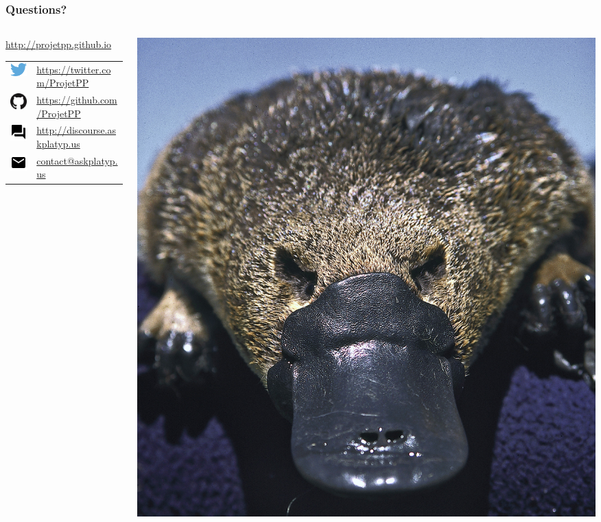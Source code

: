 \newlength{\logosize}
\setlength{\logosize}{12pt}
\begin{frame}
    \frametitle{Questions?}  
    \begin{columns}
    \begin{column}{0.55\textwidth}
        \alert{\url{http://projetpp.github.io}}\vspace{5pt}
        \begin{tabular}{ll}
            \includegraphics[width=\logosize]{Twitter_logo_blue.png} & \href{https://twitter.com/ProjetPP}{https://twitter.com/ProjetPP}\\
            \includegraphics[width=\logosize]{GitHub-Mark-32px.png} &  \href{https://github.com/ProjetPP}{https://github.com/ProjetPP}\\
            \includegraphics[width=\logosize]{figures/forum.png} &  \href{http://discourse.askplatyp.us}{http://discourse.askplatyp.us}\\
            \includegraphics[width=\logosize]{ic_email_black_18dp.png} & \href{mailto:askplatyp.us}{contact@askplatyp.us}\\
        \end{tabular}
    \end{column}
    \begin{column}{0.5\textwidth}
        \includegraphics[width=\linewidth]{figures/Ornithorhynchus.jpg}

\end{column}
\end{columns}
\end{frame}

